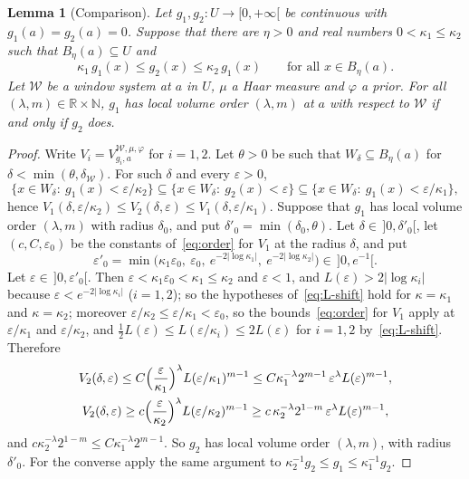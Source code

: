 \documentclass[11pt,a4paper]{article}
\newtheorem{lemma}[theorem]{Lemma}
\theoremstyle{definition}
\theoremstyle{remark}
\numberwithin{equation}{section}
\newcommand{\N}{\mathbb{N}}
\newcommand{\R}{\mathbb{R}}
\newcommand{\abs}[1]{\lvert #1\rvert}
\newcommand{\eps}{\varepsilon}
\begin{document}
\begin{lemma}[Comparison]\label{lem:compare}
Let $g_1,g_2:U\to[0,+\infty[$ be continuous with $g_1(a)=g_2(a)=0$. Suppose that there are $\eta>0$ and real numbers $0<\kappa_1\le\kappa_2$ such that $B_\eta(a)\subseteq U$ and
\[
\kappa_1\,g_1(x)\le g_2(x)\le\kappa_2\,g_1(x)\qquad\text{for all }x\in B_\eta(a).
\]
Let $\mathcal W$ be a window system at $a$ in $U$, $\mu$ a Haar measure and $\varphi$ a prior. For all $(\lambda,m)\in\R\times\N$, $g_1$ has local volume order $(\lambda,m)$ at $a$ with respect to $\mathcal W$ if and only if $g_2$ does.
\end{lemma}
\begin{proof}
Write $V_i=V^{\mathcal W,\mu,\varphi}_{g_i,a}$ for $i=1,2$. Let $\theta>0$ be such that $W_\delta\subseteq B_\eta(a)$ for $\delta<\min(\theta,\delta_{\mathcal W})$. For such $\delta$ and every $\eps>0$,
\[
\{x\in W_\delta:\ g_1(x)<\eps/\kappa_2\}\subseteq\{x\in W_\delta:\ g_2(x)<\eps\}\subseteq\{x\in W_\delta:\ g_1(x)<\eps/\kappa_1\},
\]
hence $V_1(\delta,\eps/\kappa_2)\le V_2(\delta,\eps)\le V_1(\delta,\eps/\kappa_1)$. Suppose that $g_1$ has local volume order $(\lambda,m)$ with radius $\delta_0$, and put $\delta'_0=\min(\delta_0,\theta)$. Let $\delta\in\,]0,\delta'_0[$, let $(c,C,\eps_0)$ be the constants of~\eqref{eq:order} for $V_1$ at the radius $\delta$, and put
\[
\eps'_0=\min\bigl(\kappa_1\eps_0,\ \eps_0,\ e^{-2\abs{\log\kappa_1}},\ e^{-2\abs{\log\kappa_2}}\bigr)\in\,]0,e^{-1}[ .
\]
Let $\eps\in\,]0,\eps'_0[$. Then $\eps<\kappa_1\eps_0<\kappa_1\le\kappa_2$ and $\eps<1$, and $L(\eps)>2\abs{\log\kappa_i}$ because $\eps<e^{-2\abs{\log\kappa_i}}$ ($i=1,2$); so the hypotheses of~\eqref{eq:L-shift} hold for $\kappa=\kappa_1$ and $\kappa=\kappa_2$; moreover $\eps/\kappa_2\le\eps/\kappa_1<\eps_0$, so the bounds~\eqref{eq:order} for $V_1$ apply at $\eps/\kappa_1$ and $\eps/\kappa_2$, and $\frac{1}{2}L(\eps)\le L(\eps/\kappa_i)\le2L(\eps)$ for $i=1,2$ by~\eqref{eq:L-shift}. Therefore
\begin{gather*}
V_2(\delta,\eps)\le C\Bigl(\frac{\eps}{\kappa_1}\Bigr)^\lambda L(\eps/\kappa_1)^{m-1}\le C\kappa_1^{-\lambda}2^{m-1}\,\eps^\lambda L(\eps)^{m-1},\\
V_2(\delta,\eps)\ge c\Bigl(\frac{\eps}{\kappa_2}\Bigr)^\lambda L(\eps/\kappa_2)^{m-1}\ge c\,\kappa_2^{-\lambda}2^{1-m}\,\eps^\lambda L(\eps)^{m-1},
\end{gather*}
and $c\kappa_2^{-\lambda}2^{1-m}\le C\kappa_1^{-\lambda}2^{m-1}$. So $g_2$ has local volume order $(\lambda,m)$, with radius $\delta'_0$. For the converse apply the same argument to $\kappa_2^{-1}g_2\le g_1\le\kappa_1^{-1}g_2$.
\end{proof}
\end{document}
